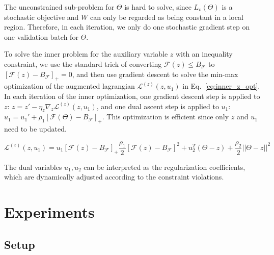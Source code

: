 \documentclass[runningheads]{llncs}
\newcommand{\flops}{\mathcal{F}}
\newcommand{\invas}{\Theta}
\newcommand{\lag}{\mathcal{L}}
\begin{document}
  
  The unconstrained sub-problem for $\invas$ is hard to solve, since $L_v(\invas)$ is a stochastic objective and $W$ can only be regarded as being constant in a local region. Therefore, in each iteration, we only do one stochastic gradient step on one validation batch for $\invas$. 
  
  To solve the inner problem for the auxiliary variable $z$ with an inequality constraint, we use the standard trick of converting $\flops(z) \leq B_\flops$ to $[\flops(z) - B_\flops]_+ = 0$, and then use gradient descent to solve the min-max optimization of the augmented lagrangian $\lag^{(z)}(z, u_1)$ in Eq.~\ref{eq:inner_z_opt}. In each iteration of the inner optimization, one gradient descent step is applied to $z$: $z = z' - \eta_z \nabla_z\lag^{(z)}(z, u_1)$, and one dual ascent step is applied to $u_1$: $u_1 = u_1' + \rho_1 [\flops(\invas) - B_\flops]_+$. This optimization is efficient since only $z$ and $u_1$ need to be updated.
  
  
  \begin{equation}
  \lag^{(z)}(z, u_1) = u_1 [\flops(z) - B_\flops]_+ \frac{\rho_1}{2} [\flops(z) - B_\flops]^2 + u_2^T (\invas - z) + \frac{\rho_2}{2} ||\invas - z||^2
  \label{eq:inner_z_opt}
  \end{equation}
  
  
  The dual variables $u_1, u_2$ can be interpreted as the regularization coefficients, which are dynamically adjusted according to the constraint violations. 
  
  
  
  
  
  \section{Experiments}
  \label{sec:exp}
  \subsection{Setup}
  
\end{document}
